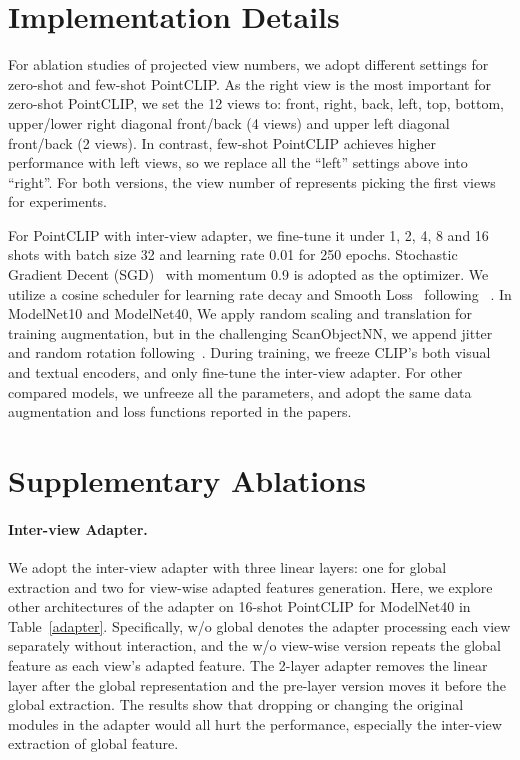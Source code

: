 \documentclass[10pt,twocolumn,letterpaper]{article}
\begin{document}
\section{Implementation Details}
For ablation studies of projected view numbers, we adopt different settings for zero-shot and few-shot PointCLIP. As the right view is the most important for zero-shot PointCLIP, we set the 12 views to: front, right, back, left, top, bottom, upper/lower right diagonal front/back (4 views) and upper left diagonal front/back (2 views). In contrast, few-shot PointCLIP achieves higher performance with left views, so we replace all the ``left'' settings above into ``right''. For both versions, the view number of  represents picking the first  views for experiments.

For PointCLIP with inter-view adapter, we fine-tune it under 1, 2, 4, 8 and 16 shots with batch size 32 and learning rate 0.01 for 250 epochs. Stochastic Gradient Decent (SGD)~\cite{kingma2014adam} with momentum 0.9 is adopted as the optimizer. We utilize a cosine scheduler for learning rate decay and Smooth Loss~\cite{wang2019dynamic} following ~\cite{goyal2021revisiting}. In ModelNet10 and ModelNet40, We apply random scaling and translation for training augmentation, but in the challenging ScanObjectNN, we append jitter and random rotation following~\cite{qi2017pointnet}. During training, we freeze CLIP's both visual and textual encoders, and only fine-tune the inter-view adapter. For other compared models, we unfreeze all the parameters, and adopt the same data augmentation and loss functions reported in the papers.
\section{Supplementary Ablations}
\paragraph{Inter-view Adapter.}
We adopt the inter-view adapter with three linear layers: one for global extraction and two for view-wise adapted features generation. Here, we explore other architectures of the adapter on 16-shot PointCLIP for ModelNet40 in Table~\ref{adapter}. Specifically, w/o global denotes the adapter processing each view separately without interaction, and the w/o view-wise version repeats the global feature as each view's adapted feature. The 2-layer adapter removes the linear layer after the global representation and the pre-layer version moves it before the global extraction. The results show that dropping or changing the original modules in the adapter would all hurt the performance, especially the inter-view extraction of global feature.
\end{document}
